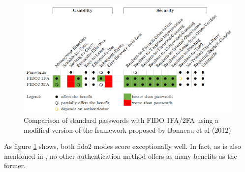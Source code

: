 \begin{figure}[ht]
    \centering
    \includegraphics[width=1.8\columnwidth]{Figures/bonneau_matrix.png}
    \caption[Comparison of Authentication Methods]{Comparison of standard passwords with FIDO 1FA/2FA using a modified version of the framework proposed by Bonneau et al (2012)}
    \label{fig:bonneau_matrix}
\end{figure}

\noindent As figure \ref{fig:bonneau_matrix} shows, both \ac{fido2} modes score exceptionally well. In fact, as is also mentioned in \cite{lyastani2020}, no other authentication method offers as many benefits as the former.
